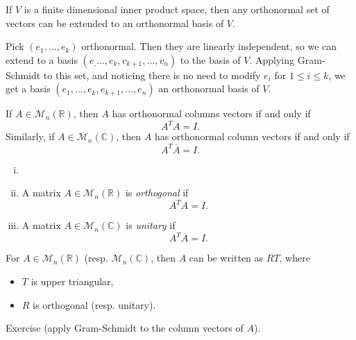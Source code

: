 \documentclass[12pt]{article}
\begin{document}
\begin{corollary}
	If $V$ is a finite dimensional inner product space, then any orthonormal set of vectors can be extended to an orthonormal basis of $V$.
\end{corollary}

\begin{proofbox}
	Pick $(e_1, \ldots, e_k)$ orthonormal. Then they are linearly independent, so we can extend to a basis $(e_, \ldots, e_k, v_{k+1}, \ldots, v_n)$ to the basis of $V$. Applying Gram-Schmidt to this set, and noticing there is no need to modify $e_i$ for $1 \leq i \leq k$, we get a basis $(e_1, \ldots, e_k, e_{k+1}, \ldots, e_n)$ an orthonormal basis of $V$.
\end{proofbox}

\begin{remark}
	If $A \in \mathcal{M}_n(\mathbb{R})$, then $A$ has orthonormal columns vectors if and only if
	\[
	A^{T}A = I
	.\]
	Similarly, if $A \in \mathcal{M}_n(\mathbb{C})$, then $A$ has orthonormal column vectors if and only if
	\[
	A^{T}\overline{A} = I
	.\]
\end{remark}

\begin{definition}
	\begin{enumerate}[(i)]
		\item[]
		\item A matrix $A \in \mathcal{M}_n(\mathbb{R})$ is \textit{orthogonal} if
		\[
		A^{T}A = I
		.\]
	\item A matrix $A \in \mathcal{M}_n(\mathbb{C})$ is \textit{unitary} if
		\[
		A^{T}\overline{A} = I
		.\]
	\end{enumerate}
\end{definition}

\begin{proposition}
	For $A \in \mathcal{M}_n(\mathbb{R})$ (resp. $\mathcal{M}_n(\mathbb{C})$, then $A$ can be written as $RT$, where
	\begin{itemize}
		\item $T$ is upper triangular,
		\item $R$ is orthogonal (resp. unitary).
	\end{itemize}
\end{proposition}

\begin{proofbox}
	Exercise (apply Gram-Schmidt to the column vectors of $A$).
\end{proofbox}
\end{document}
